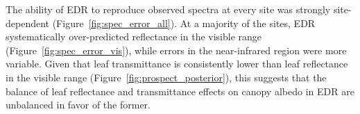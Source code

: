 The ability of EDR to reproduce observed spectra at every site was strongly site-dependent (Figure~\ref{fig:spec_error_all}).
At a majority of the sites, EDR systematically over-predicted reflectance in the visible range (Figure~\ref{fig:spec_error_vis}), while errors in the near-infrared region were more variable.
Given that leaf transmittance is consistently lower than leaf reflectance in the visible range (Figure~\ref{fig:prospect_posterior}), this suggests that the balance of leaf reflectance and transmittance effects on canopy albedo in EDR are unbalanced in favor of the former.



